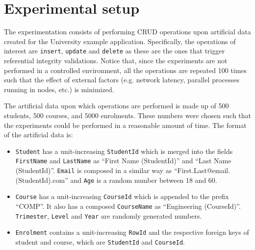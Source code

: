 \section{Experimental setup}\label{sexp:ExperimentalSetup}



The experimentation consists of performing \ac{CRUD} operations upon artificial
data created for the University example application. Specifically, the
operations of interest are \texttt{insert}, \texttt{update} and \texttt{delete}
as these are the ones that trigger referential integrity validations. Notice
that, since the experiments are not performed in a controlled environment, all
the operations are repeated 100 times such that the effect of external factors
(e.g. network latency, parallel processes running in nodes, etc.)  is minimized.


The artificial data upon which operations are performed  is made up of 500
students, 500 courses, and 5000 enrolments. These numbers were chosen such that
the experiments could be performed in a reasonable amount of time. 
The format of the artificial data is:

	\begin{itemize}
		\item \texttt{Student} has a
		unit-increasing \texttt{StudentId}  which is merged into the fields \texttt{FirstName}
		 and \texttt{LastName} as ``First Name (StudentId)'' and ``Last Name
		(StudentId)''.  \texttt{Email} is composed in a similar way as
		``First.Last@email.(StudentId).com'' and \texttt{Age} is a random number
		between 18 and 60.
		
		\item  \texttt{Course} has a unit-increasing \texttt{CourseId} which is
		appended to the prefix ``COMP''.  It also has a composed \texttt{CourseName}
		as ``Engineering (CourseId)''.  \texttt{Trimester}, \texttt{Level}
		and \texttt{Year} are randomly generated numbers.
		
		\item  \texttt{Enrolment} contains a unit-increasing \texttt{RowId}  and the
		respective foreign keys of student and course,  which are \texttt{StudentId}
		and \texttt{CourseId}. 
	\end{itemize}
 
